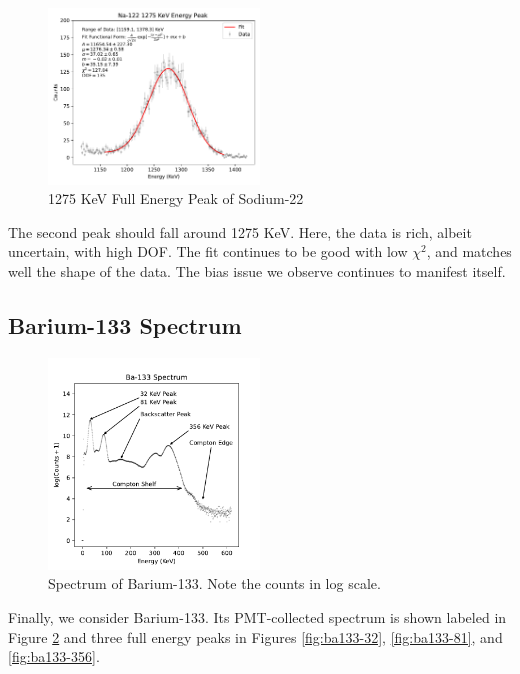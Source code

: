 \documentclass[12pt, letterpaper]{article}
\begin{document}
\begin{figure}[!h]
    \centering
    \includegraphics[width=0.5\textwidth]{experiment1/figures/na22/peak-1275.pdf}
    \caption{1275 KeV Full Energy Peak of Sodium-22}
    \label{fig:na22-1275}
\end{figure}

The second peak should fall around 1275 KeV. Here, the data is rich, albeit uncertain, with high DOF. The fit continues to be good with low $\chi^2$, and matches well the shape of the data. The bias issue we observe continues to manifest itself. 


\subsection{Barium-133 Spectrum}

\begin{figure}[!h]
    \centering
    \includegraphics[width=0.5\textwidth]{experiment1/figures/ba133/spectrum.pdf}
    \caption{Spectrum of Barium-133. Note the counts in log scale.}
    \label{fig:ba133-spectrum}
\end{figure}

Finally, we consider Barium-133. Its PMT-collected spectrum is shown labeled in Figure \ref{fig:ba133-spectrum} and three full energy peaks in Figures \ref{fig:ba133-32}, \ref{fig:ba133-81}, and \ref{fig:ba133-356}. 
\end{document}
